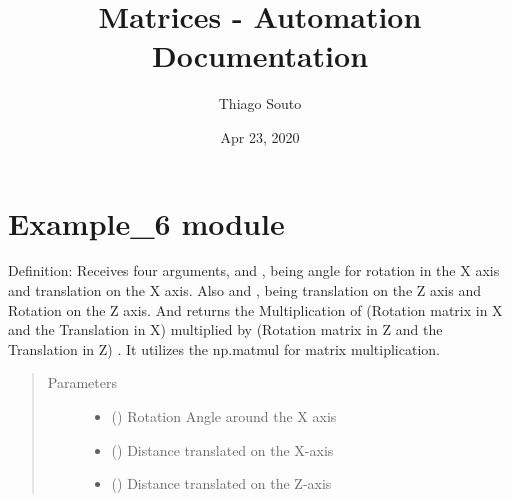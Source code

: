 \documentclass[letterpaper,10pt,english]{sphinxmanual}
\title{Matrices - Automation Documentation}
\date{Apr 23, 2020}
\author{Thiago Souto}
\begin{document}
\maketitle
\sphinxtableofcontents
{}\label{\detokenize{index::doc}}



\chapter{Example\_6 module}
\label{\detokenize{rst/Example_6:example-6-module}}\label{\detokenize{rst/Example_6::doc}}\label{\detokenize{rst/Example_6:welcome-to-matrices-automation-s-documentation}}\label{\detokenize{rst/Example_6:module-Example_6}}

\begin{fulllineitems}
\label{\detokenize{rst/Example_6:Example_6.T}}
Definition: Receives four arguments,  and , being angle for rotation in the X axis and translation on
the X axis. Also  and , being translation on the Z axis and Rotation on the Z axis. And returns the
Multiplication of (Rotation matrix in X and the Translation in X) multiplied by (Rotation matrix in Z and the
Translation in Z) . It utilizes the np.matmul for matrix multiplication.
\begin{quote}\begin{description}
\item[{Parameters}] \leavevmode\begin{itemize}
\item {} 
 () \textendash{} Rotation Angle around the X axis

\item {} 
 () \textendash{} Distance translated on the X-axis

\item {} 
 () \textendash{} Distance translated on the Z-axis


\end{itemize}
\end{description}
\end{quote}
\end{fulllineitems}
\end{document}
